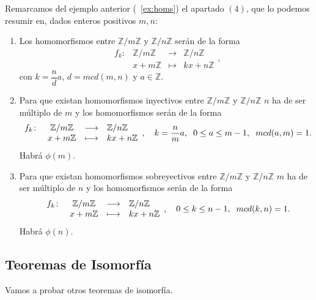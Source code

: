 \documentclass[12pt]{article}
\begin{document}
Remarcamos del ejemplo anterior (~\ref{ex:homs}) el apartado $(4)$, que lo podemos resumir en, dados enteros positivos $m,n$: 
\begin{enumerate}
\item Los homomorfismos entre $\mathbb{Z}/m\mathbb{Z}$ y $\mathbb{Z}/n\mathbb{Z}$ serán de la forma $$\begin{array}{rccl}
f_{k}\colon &\mathbb{Z}/m\mathbb{Z}& \longrightarrow &\mathbb{Z}/n\mathbb{Z}\\
&x+m\mathbb{Z}& \longmapsto &kx + n\mathbb{Z}
\end{array},$$ con $k = \dfrac{n}{d}a$, $d = mcd(m,n)$ y $a \in \mathbb{Z}$.
\item Para que existan homomorfismos inyectivos entre $\mathbb{Z}/m\mathbb{Z}$ y $\mathbb{Z}/n\mathbb{Z}$ $n$ ha de ser múltiplo de $m$ y los homomorfismos serán de la forma $$\begin{array}{rccl}
f_{k}\colon &\mathbb{Z}/m\mathbb{Z}& \longrightarrow &\mathbb{Z}/n\mathbb{Z}\\
&x+m\mathbb{Z}& \longmapsto &kx + n\mathbb{Z}
\end{array}, \quad k=\dfrac{n}{m}a, \hspace{0.2cm} 0 \leq a \leq m-1, \hspace{0.2cm} mcd(a,m)=1.$$ Habrá $\phi(m)$.
\item Para que existan homomorfismos sobreyectivos entre $\mathbb{Z}/m\mathbb{Z}$ y $\mathbb{Z}/n\mathbb{Z}$ $m$ ha de ser múltiplo de $n$ y los homomorfismos serán de la forma $$\begin{array}{rccl}
f_{k}\colon &\mathbb{Z}/m\mathbb{Z}& \longrightarrow &\mathbb{Z}/n\mathbb{Z}\\
&x+m\mathbb{Z}& \longmapsto &kx + n\mathbb{Z}
\end{array},
 \quad 0 \leq k \leq n-1, \hspace{0.2cm} mcd(k,n)=1.$$ Habrá $\phi(n)$.
\end{enumerate}

\subsection{Teoremas de Isomorfía}

Vamos a probar otros teoremas de isomorfía.
\end{document}
